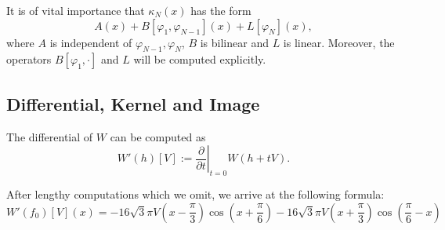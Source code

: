 \documentclass{amsart}
\begin{document}
It is of vital importance that $\kappa_N(x)$ has the form
\[A(x) + B[\varphi_1, \varphi_{N-1}](x) + L[\varphi_N](x),\]
where $A$ is independent of $\varphi_{N-1}, \varphi_N$, $B$ is bilinear and $L$ is linear.
Moreover, the operators $B[\varphi_1, \cdot]$ and $L$ will be computed explicitly.

\subsection{Differential, Kernel and Image}

The differential of $W$ can be computed as
\[W'(h)[V] := \left.\frac\partial {\partial t} \right|_{t=0}W(h+t V).\]

After lengthy computations which we omit, we arrive at the following formula:
\[W'(f_0)[V](x) = -16 \sqrt{3} \pi V\left(x-\frac{\pi }{3}\right) \cos \left(x+\frac{\pi }{6}\right)-16 \sqrt{3} \pi V\left(x+\frac{\pi }{3}\right) \cos \left(\frac{\pi }{6}-x\right)\]
\end{document}
